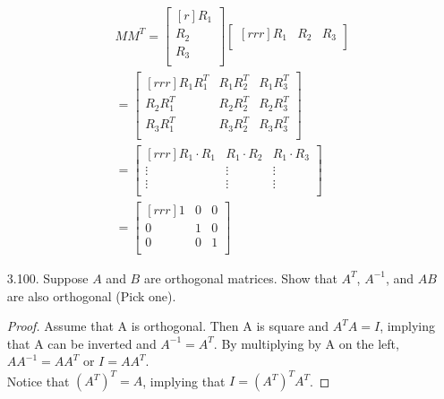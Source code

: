\documentclass[12pt]{article}
\begin{document}
\begin{enumerate}
\begin{enumerate}
\begin{align*}
	MM^T = \begin{bmatrix}[r] R_1\\ R_2\\ R_3\\ \end{bmatrix}
	\begin{bmatrix}[rrr] R_1 & R_2 & R_3\\ \end{bmatrix}\\
	=
	\begin{bmatrix}[rrr]
	R_1R_1^T & R_1R_2^T & R_1R_3^T\\
	R_2R_1^T & R_2R_2^T & R_2R_3^T\\
	R_3R_1^T & R_3R_2^T & R_3R_3^T\\
	\end{bmatrix}\\
	=
	\begin{bmatrix}[rrr]
	R_1 \cdot R_1 & R_1 \cdot R_2 & R_1 \cdot R_3\\
	\vdots & \vdots & \vdots\\
	\vdots & \vdots & \vdots\\
	\end{bmatrix}\\
	=
	\begin{bmatrix}[rrr]
	1 & 0 & 0\\
	0 & 1 & 0\\
	0 & 0 & 1\\
	\end{bmatrix}
	\end{align*}
	\end{enumerate}


\item [3.100.] Suppose $A$ and $B$ are orthogonal matrices. Show that $A^T$, $A^{-1}$, and $AB$ are also orthogonal (Pick one).\\
\begin{proof}
Assume that A is orthogonal. Then A is square and $A^TA=I$, implying that A can be inverted and $A^{-1}=A^T$. By multiplying by A on the left, $AA^{-1} = AA^T$ or $I=AA^T$.\\
Notice that $(A^T)^T = A$, implying that $I=(A^T)^TA^T$.
\end{proof}

\end{enumerate}
\end{document}
